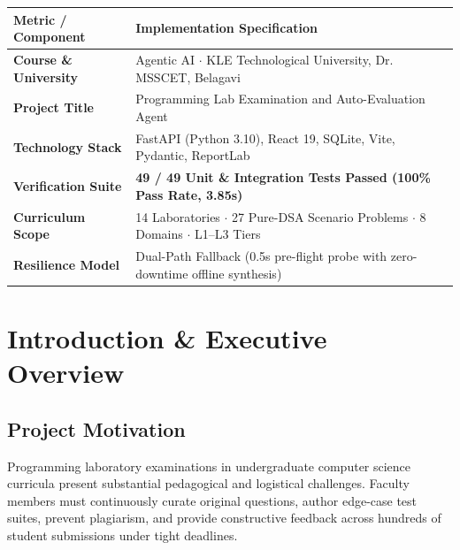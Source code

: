 \documentclass[12pt, a4paper]{report}
\begin{document}
\vspace{0.4cm}
\begin{center}
\renewcommand{\arraystretch}{1.2}
\small
\begin{tabular}{|L{3.5cm}|L{11.5cm}|}
\hline
{}
\color{white}\textbf{Metric / Component} & \color{white}\textbf{Implementation Specification} \\
\hline
\textbf{Course \& University} & Agentic AI $\cdot$ KLE Technological University, Dr. MSSCET, Belagavi \\
\hline
{}
\textbf{Project Title} & Programming Lab Examination and Auto-Evaluation Agent \\
\hline
\textbf{Technology Stack} & FastAPI (Python 3.10), React 19, SQLite, Vite, Pydantic, ReportLab \\
\hline
{}
\textbf{Verification Suite} & \textbf{\color{successgreen}49 / 49 Unit \& Integration Tests Passed (100\% Pass Rate, 3.85s)} \\
\hline
\textbf{Curriculum Scope} & 14 Laboratories $\cdot$ 27 Pure-DSA Scenario Problems $\cdot$ 8 Domains $\cdot$ L1--L3 Tiers \\
\hline
{}
\textbf{Resilience Model} & Dual-Path Fallback (0.5s pre-flight probe with zero-downtime offline synthesis) \\
\hline
\end{tabular}
\end{center}

\newpage
\tableofcontents

\vspace{1.0cm}
\listoftables

\newpage
{}
\setcounter{page}{1}

\chapter{Introduction \& Executive Overview}

\section{Project Motivation}
Programming laboratory examinations in undergraduate computer science curricula present substantial pedagogical and logistical challenges. Faculty members must continuously curate original questions, author edge-case test suites, prevent plagiarism, and provide constructive feedback across hundreds of student submissions under tight deadlines. 
\end{document}
